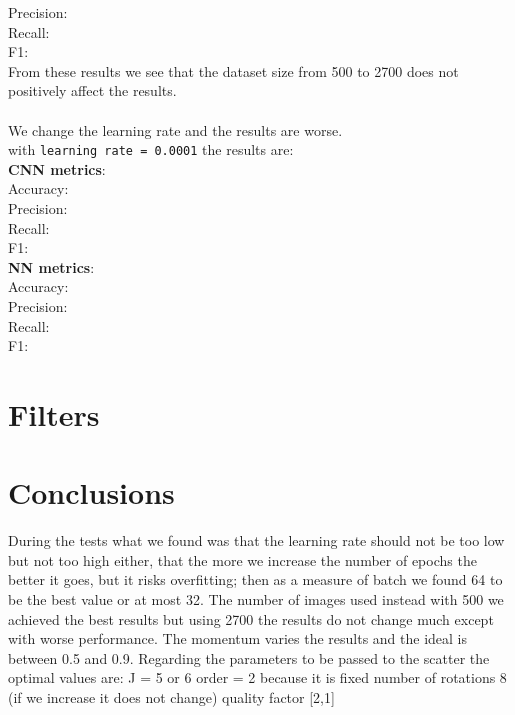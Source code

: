 \documentclass{report}
\begin{document}
Precision:\\
Recall:\\
F1:\\
From these results we see that the dataset size from 500 to 2700 does not positively affect the results.\\\\
We change the learning rate and the results are worse.\\
with \texttt{learning rate = 0.0001} the results are: \\
\textbf{CNN metrics}:\\
Accuracy:\\
Precision:\\
Recall:\\
F1:\\
\textbf{NN metrics}:\\
Accuracy:\\
Precision:\\
Recall:\\
F1:\\
\chapter{Filters}
\chapter{Conclusions}
During the tests what we found was that the learning rate should not be too low but not too high either, that the more we increase the number of epochs the better it goes, but it risks overfitting; then as a measure of batch we found 64 to be the best value or at most 32. The number of images used instead with 500 we achieved the best results but using 2700 the results do not change much except with worse performance. The momentum varies the results and the ideal is between 0.5 and 0.9.
Regarding the parameters to be passed to the scatter the optimal values are: 
J = 5 or 6
order = 2 because it is fixed
number of rotations 8 (if we increase it does not change)
quality factor [2,1]
\end{document}
